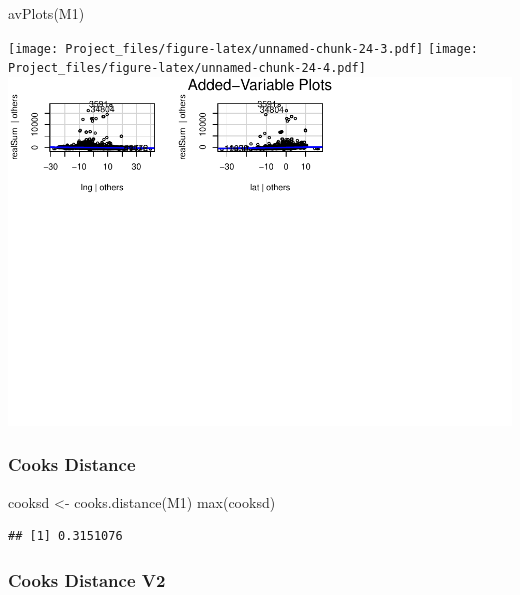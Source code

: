\documentclass[
]{article}
\newenvironment{Shaded}{\begin{snugshade}}{\end{snugshade}}
\newcommand{\FunctionTok}[1]{\textcolor[rgb]{0.00,0.00,0.00}{#1}}
\newcommand{\NormalTok}[1]{#1}
\newcommand{\OtherTok}[1]{\textcolor[rgb]{0.56,0.35,0.01}{#1}}
\newcommand{\SpecialCharTok}[1]{\textcolor[rgb]{0.00,0.00,0.00}{#1}}
\begin{document}
\begin{Shaded}
\begin{Highlighting}[]
\FunctionTok{avPlots}\NormalTok{(M1)}
\end{Highlighting}
\end{Shaded}

\texttt{[image: Project\_files/figure-latex/unnamed-chunk-24-3.pdf]}
\texttt{[image: Project\_files/figure-latex/unnamed-chunk-24-4.pdf]}
\includegraphics{Project_files/figure-latex/unnamed-chunk-24-5.pdf}

\hypertarget{cooks-distance}{%
\subsubsection{Cooks Distance}\label{cooks-distance}}

\begin{Shaded}
\begin{Highlighting}[]
\NormalTok{cooksd }\OtherTok{\textless{}{-}} \FunctionTok{cooks.distance}\NormalTok{(M1)}
\FunctionTok{max}\NormalTok{(cooksd)}
\end{Highlighting}
\end{Shaded}

\begin{verbatim}
## [1] 0.3151076
\end{verbatim}

\hypertarget{cooks-distance-v2}{%
\subsubsection{Cooks Distance V2}\label{cooks-distance-v2}}

\begin{Shaded}
\end{Shaded}
\end{document}
